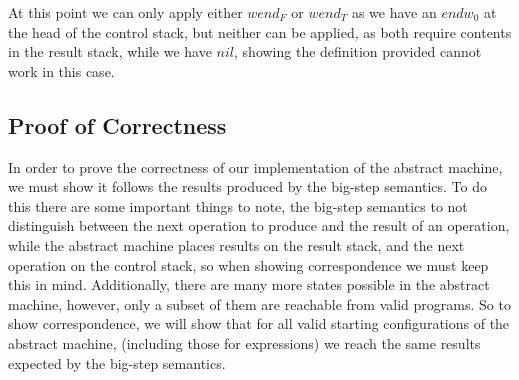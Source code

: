 At this point we can only apply either $wend_F$ or $wend_T$ as we have an $endw_0$ at the head of the control stack, but neither can be applied, as both require contents in the result stack, while we have $nil$, showing the definition provided cannot work in this case.

\subsection{Proof of Correctness}\label{appendix:amproof}

In order to prove the correctness of our implementation of the abstract machine, we must show it follows the results produced by the big-step semantics. To do this there are some important things to note, the big-step semantics to not distinguish between the next operation to produce and the result of an operation, while the abstract machine places results on the result stack, and the next operation on the control stack, so when showing correspondence we must keep this in mind. Additionally, there are many more states possible in the abstract machine, however, only a subset of them are reachable from valid \rimplang programs. So to show correspondence, we will show that for all valid starting configurations of the abstract machine, (including those for expressions) we reach the same results expected by the big-step semantics.

\renewcommand{\astate}[4]{%
    \langle%
    \if\relax\detokenize{#1}\relax c\else #1 \cdot c\fi, %
    \if\relax\detokenize{#2}\relax r\else #2 \cdot r\fi, %
    \if\relax\detokenize{#3}\relax m\else m[#3]\fi, %
    \if\relax\detokenize{#4}\relax b\else #4 \cdot b\fi %
    \rangle%
}

\renewcommand{\bstate}[4]{%
    \langle%
    \if\relax\detokenize{#1}\relax c\else #1 \cdot c\fi, %
    \if\relax\detokenize{#2}\relax r\else #2 \cdot r\fi, %
    \if\relax\detokenize{#3}\relax m\else m[#3]\fi, %
    \if\relax\detokenize{#4}\relax b\else #4 \cdot b\fi %
    \rangle%
}

\renewcommand{\arule}[1]{\overset{#1}{\to}}

